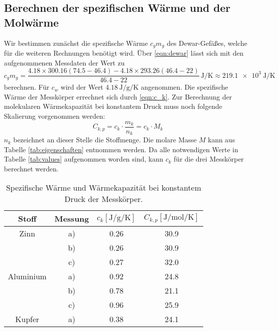 \subsection{Berechnen der spezifischen Wärme und der Molwärme}
Wir bestimmen zunächst die spezifische Wärme $c_gm_g$ des Dewar-Gefäßes, welche für die weiteren Rechnungen benötigt wird.
Über \eqref{eqn:dewar}
lässt sich mit den aufgenommenen Messdaten der Wert zu
\begin{equation} %
    c_gm_g = \frac{4.18\times300.16(74.5-46.4)-4.18\times293.26(46.4-22)}{46.4-22} \, \si{\joule\per\kelvin} \approx \SI{219.1e3}{\joule\per\kelvin} %
\end{equation} %
berechnen.
Für $c_w$ wird der Wert $\SI{4.18}{\joule\per\g\per\kelvin}$ angenommen\cite{Versuchsanleitung}. %
Die spezifische Wärme der Messkörper errechnet sich durch \eqref{eqn:c_k}.
Zur Berechnung der molekularen Wärmekapazität bei konstantem Druck muss noch folgende Skalierung vorgenommen werden:
\begin{equation}
    C_{k,p}=c_k \cdot \frac{m_k}{n_k}=c_k \cdot M_k 
\end{equation}
$n_k$ bezeichnet an dieser Stelle die Stoffmenge. Die molare Masse $M$ kann aus Tabelle \ref{tab:eigenschaften} entnommen werden. 
Da alle notwendigen Werte in Tabelle \ref{tab:values} aufgenommen worden sind, kann $c_k$ für die drei Messkörper berechnet werden. %
\begin{table}
    \centering
    \caption{Spezifische Wärme und Wärmekapazität bei konstantem Druck der Messkörper.}
    \label{tab:c_k-Werte}
    \begin{tabular}{c c | S[table-format=4.2] S[table-format=3.1]}
        \toprule
        Stoff & Messung & $c_k[\si{\joule\per\g\per\kelvin}]$ & $C_{k,p}[\si{\joule\per\mol\per\kelvin}]$\\
        \midrule
        Zinn        & a) &   0.26 & 30.9   \\
                    & b) &   0.26 & 30.9   \\
                    & c) &   0.27 & 32.0   \\
        Aluminium   & a) &   0.92 & 24.8   \\
                    & b) &   0.78 & 21.1   \\
                    & c) &   0.96 & 25.9   \\
        Kupfer      & a) &   0.38 & 24.1   \\
        \bottomrule
    \end{tabular}
\end{table}

